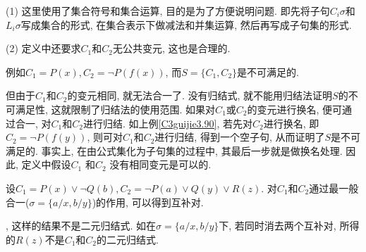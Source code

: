 \begin{remark}
(1) 这里使用了集合符号和集合运算, 目的是为了方便说明问题. 即先将子句$C_i\sigma$和$L_i\sigma$写成集合的形式, 在集合表示下做减法和并集运算, 然后再写成子句集的形式.

(2) 定义中还要求$C_1$和$C_2$无公共变元, 这也是合理的.
\end{remark}

\begin{example}\label{C3guijie3.90}
    例如$C_1=P(x), C_2=\neg P(f(x))$, 而$S=\{C_1,  C_2\}$是不可满足的.
\end{example}
\begin{remark}
但由于$C_1$和$C_2$的变元相同, 就无法合一了.
没有归结式, 就不能用归结法证明$S$的不可满足性, 这就限制了归结法的使用范围.
如果对$C_1$或$C_2$的变元进行换名, 便可通过合一, 对$C_1$和$C_2$进行归结.
如上例\ref{C3guijie3.90}, 若先对$C_2$进行换名, 即$C_2=\neg P(f(y))$, 则可对$C_1$和$C_2$进行归结, 得到一个空子句, 从而证明了$S$是不可满足的.
事实上, 在由公式集化为子句集的过程中, 其最后一步就是做换名处理. 因此, 定义中假设$C_1$ 和$C_2$ 没有相同变元是可以的.
\end{remark}

\begin{example}
    设$C_1=P(x)\vee \neg Q(b), C_2=\neg P(a)\vee Q(y)\vee R(z)$. 对$C_1$和$C_2$通过最一般合一($\sigma =\{a/x, b/y\}$)的作用, 可以得到互补对.
\end{example}
\begin{remark}
    , 这样的结果不是二元归结式. 如在$\sigma =\{a/x, b/y\}$下, 若同时消去两个互补对, 所得的$R(z)$不是$C_1$和$C_2$的二元归结式.
\end{remark}

